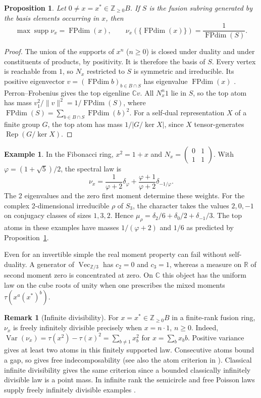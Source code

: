 \documentclass[11pt,reqno]{amsart}
\newtheorem{proposition}[theorem]{Proposition}
\theoremstyle{definition}
\newtheorem{example}[theorem]{Example}
\newtheorem{remark}[theorem]{Remark}
\newcommand{\FPdim}{\operatorname{FPdim}}
\newcommand{\RR}{\mathbb R}
\newcommand{\CC}{\mathbb C}
\newcommand{\ZZ}{\mathbb Z}
\newcommand{\Rep}{\operatorname{Rep}}
\newcommand{\Vect}{\operatorname{Vec}}
\DeclareMathOperator{\supp}{supp}
\begin{document}
\begin{proposition}\label{thm:fp}
Let $0\ne x=x^*\in\ZZ_{\ge0}B$. If $S$ is the fusion subring generated
by the basis elements occurring in $x$, then
\[
 \max\supp\nu_x=\FPdim(x),\qquad
 \nu_x(\{\FPdim(x)\})=\frac{1}{\FPdim(S)}.
\]
\end{proposition}
\begin{proof}
The union of the supports of $x^n$ ($n\ge0$) is closed under duality and under constituents of products, by positivity. It is therefore the basis of $S$. Every vertex is reachable from $1$, so $N_x$ restricted to $S$ is symmetric and irreducible. Its positive eigenvector $v=(\FPdim b)_{b\in B\cap S}$ has eigenvalue $\FPdim(x)$ \cite[Propositions~3.3.6 and~3.3.11]{EGNO}. Perron--Frobenius gives the top eigenline $\CC v$. All $N_x^n1$ lie in $S$, so the top atom has mass $v_1^2/\|v\|^2=1/\FPdim(S)$, where $\FPdim(S)=\sum_{b\in B\cap S}\FPdim(b)^2$. For a self-dual representation $X$ of a finite group $G$, the top atom has mass $1/|G/\ker X|$, since $X$ tensor-generates $\Rep(G/\ker X)$.
\end{proof}

\begin{example}\label{ex:fusion}
In the Fibonacci ring, $x^2=1+x$ and $N_x=\left(\begin{smallmatrix}0&1\\1&1\end{smallmatrix}\right)$. With $\varphi=(1+\sqrt5)/2$, the spectral law is
\[
     \nu_x=\frac{1}{\varphi+2}\delta_\varphi+
                \frac{\varphi+1}{\varphi+2}\delta_{-1/\varphi}.
\]
The 2 eigenvalues and the zero first moment determine these weights. For the complex 2-dimensional irreducible $\rho$ of $S_3$, the character takes the values $2,0,-1$ on conjugacy classes of sizes $1,3,2$. Hence $\mu_\rho=\delta_2/6+\delta_0/2+\delta_{-1}/3$. The top atoms in these examples have masses $1/(\varphi+2)$ and $1/6$ as predicted by Proposition~\ref{thm:fp}.
\end{example}

Even for an invertible simple the real moment property can fail without
self-duality. A generator of $\Vect_{\ZZ/3}$ has $c_2=0$ and $c_3=1$,
whereas a measure on $\RR$ of second moment zero is concentrated at zero.
On $\CC$ this object has the uniform law on the cube roots of unity when
one prescribes the mixed moments $\tau(x^a(x^*)^b)$.

\begin{remark}[Infinite divisibility]\label{thm:fid}
For $x=x^*\in\ZZ_{\ge0}B$ in a finite-rank fusion ring, $\nu_x$ is freely infinitely divisible precisely when $x=n\cdot1$, $n\ge0$. Indeed,
$\operatorname{Var}(\nu_x)=\tau(x^2)-\tau(x)^2=\sum_{b\ne1}x_b^2$ for $x=\sum_bx_b b$.
Positive variance gives at least two atoms in this finitely supported law. Consecutive atoms bound a gap, so \cite[Theorem~2.5]{BW} gives free indecomposability (see also the atom criterion in \cite{BV}). Classical infinite divisibility gives the same criterion since a bounded classically infinitely divisible law is a point mass. In infinite rank the semicircle and free Poisson laws supply freely infinitely divisible examples \cite{NS}.
\end{remark}
\end{document}
